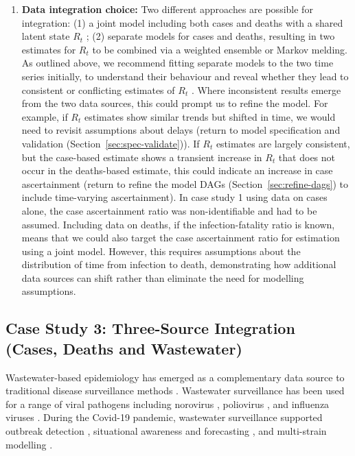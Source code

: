 \documentclass{article}
\begin{document}
\begin{enumerate}
    \item \textbf{Data integration choice:} 
       Two different approaches are possible for integration: (1) a joint model including both cases and deaths with a shared latent state $R_t$ \citep{scott2020epidemia}; (2) separate models for cases and deaths, resulting in two estimates for $R_t$ to be combined via a weighted ensemble or Markov melding.
        As outlined above, we recommend fitting separate models to the two time series initially, to understand their behaviour and reveal whether they lead to consistent or conflicting estimates of $R_t$ \citep{sherratt2021exploring}. Where inconsistent results emerge from the two data sources, this could prompt us to refine the model. For example, if $R_t$ estimates show similar trends but shifted in time, we would need to revisit assumptions about delays (return to model specification and validation (Section~\ref{sec:spec-validate})). If $R_t$ estimates are largely consistent, but the case-based estimate shows a transient increase in $R_t$ that does not occur in the deaths-based estimate, this could indicate an increase in case ascertainment (return to refine the model DAGs (Section~\ref{sec:refine-dags}) to include time-varying ascertainment). In case study 1 using data on cases alone, the case ascertainment ratio was non-identifiable and had to be assumed. Including data on deaths, if the infection-fatality ratio is known, means that we could also target the case ascertainment ratio for estimation using a joint model. However, this requires assumptions about the distribution of time from infection to death, demonstrating how additional data sources can shift rather than eliminate the need for modelling assumptions. 
\end{enumerate}

\subsection{Case Study 3: Three-Source Integration (Cases, Deaths and Wastewater)}

Wastewater-based epidemiology has emerged as a complementary data source to traditional disease surveillance methods \citep{keshaviah2023wastewater}. Wastewater surveillance has been used for a range of viral pathogens including norovirus \citep{zheng2024tracking}, poliovirus \citep{whitehouse2024wastewater}, and influenza viruses \citep{zheng2023development}. During the Covid-19 pandemic, wastewater surveillance supported outbreak detection \citep{hewitt2022sensitivity}, situational awareness and forecasting \citep{varkila2023use,jin2024combining}, and multi-strain modelling \citep{dreifuss2025estimated}. 
\end{document}
